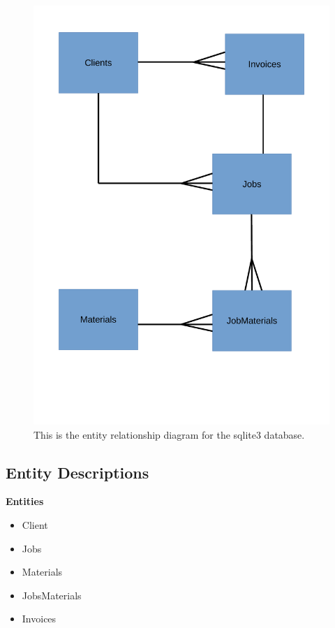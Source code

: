 \begin{figure}[H]
    \includegraphics[width=\textwidth]{./Analysis/images/entityRelationshipDiagram.pdf}
    \caption{This is the entity relationship diagram for the sqlite3 database.} \label{fig:Entity_Relationship_Diagram}
\end{figure}


\subsection{Entity Descriptions}

\textbf{Entities}
	\begin{itemize}
		\item Client
		\item Jobs
		\item Materials
		\item JobsMaterials
		\item Invoices
	\end{itemize}

